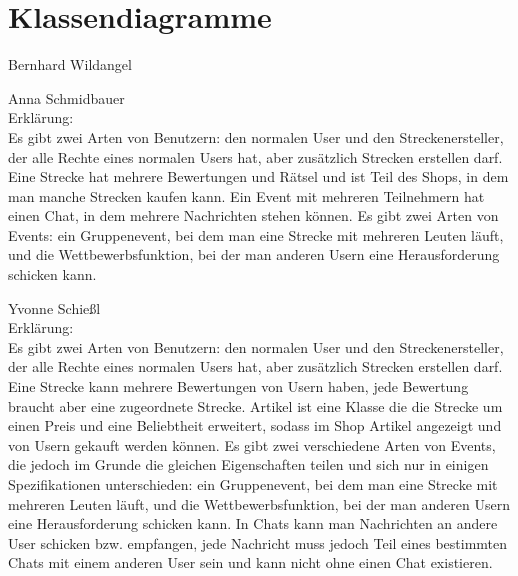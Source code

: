 \documentclass[a4paper, 12pt]{article}
\begin{document}
\newpage
\section{Klassendiagramme}

Bernhard Wildangel
\begin{figure}[H] 
\centering
\end{figure}

\begin{figure}[H] 
\centering
\end{figure}
Anna Schmidbauer\\
Erklärung:\\
Es gibt zwei Arten von Benutzern: den normalen User und den Streckenersteller, der alle Rechte eines normalen Users hat, aber zusätzlich Strecken erstellen darf. Eine Strecke hat mehrere Bewertungen und Rätsel und ist Teil des Shops, in dem man manche Strecken kaufen kann. Ein Event mit mehreren Teilnehmern hat einen Chat, in dem mehrere Nachrichten stehen können. Es gibt zwei Arten von Events: ein Gruppenevent, bei dem man eine Strecke mit mehreren Leuten läuft, und die Wettbewerbsfunktion, bei der man anderen Usern eine Herausforderung schicken kann.\\

\begin{figure}[H] 
\centering
\end{figure}
Yvonne Schießl\\
Erklärung:\\
Es gibt zwei Arten von Benutzern: den normalen User und den Streckenersteller, der alle Rechte eines normalen Users hat, aber zusätzlich Strecken erstellen darf. Eine Strecke kann mehrere Bewertungen von Usern haben, jede Bewertung braucht aber eine zugeordnete Strecke. Artikel ist eine Klasse die die Strecke um einen Preis und eine Beliebtheit erweitert, sodass im Shop Artikel angezeigt und von Usern gekauft werden können. Es gibt zwei verschiedene Arten von Events, die jedoch im Grunde die gleichen Eigenschaften teilen und sich nur in einigen Spezifikationen unterschieden: ein Gruppenevent, bei dem man eine Strecke mit mehreren Leuten läuft, und die Wettbewerbsfunktion, bei der man anderen Usern eine Herausforderung schicken kann. In Chats kann man Nachrichten an andere User schicken bzw. empfangen, jede Nachricht muss jedoch Teil eines bestimmten Chats mit einem anderen User sein und kann nicht ohne einen Chat existieren.\\
\end{document}
